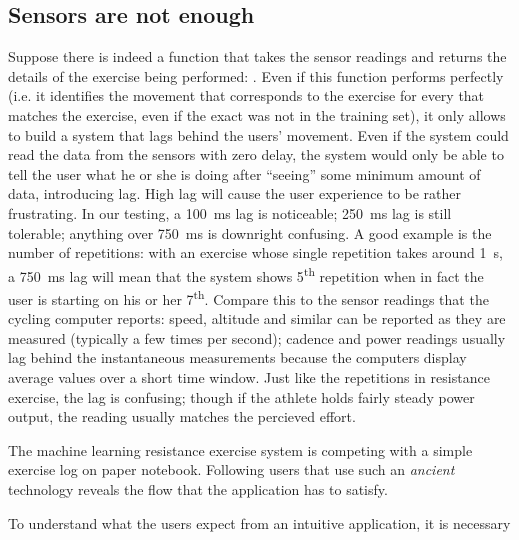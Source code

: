 \subsection{Sensors are not enough}
Suppose there is indeed a function that takes the sensor readings and returns the details of the exercise being performed: . Even if this function performs perfectly (i.e. it identifies the movement that corresponds to the exercise for every  that matches the exercise, even if the exact  was not in the training set), it only allows to build a system that lags behind the users' movement. Even if the system could read the data from the sensors with zero delay, the system would only be able to tell the user what he or she is doing after ``seeing'' some minimum amount of data, introducing lag. High lag will cause the user experience to be rather frustrating. In our testing, a \SI{100}{\milli\second} lag is noticeable; \SI{250}{\milli\second} lag is still tolerable; anything over \SI{750}{\milli\second} is downright confusing. A good example is the number of repetitions: with an exercise whose single repetition takes around \SI{1}{\second}, a \SI{750}{\milli\second} lag will mean that the system shows 5\textsuperscript{th} repetition when in fact the user is starting on his or her 7\textsuperscript{th}. Compare this to the sensor readings that the cycling computer reports: speed, altitude and similar can be reported as they are measured (typically a few times per second); cadence and power readings usually lag behind the instantaneous measurements because the computers display average values over a short time window. Just like the repetitions in resistance exercise, the lag is confusing; though if the athlete holds fairly steady power output, the reading usually matches the percieved effort.

The machine learning resistance exercise system is competing with a simple exercise log on paper notebook. Following users that use such an \emph{ancient} technology reveals the flow that the application has to satisfy. 

To understand what the users expect from an intuitive application, it is necessary

\printbibliography

 
